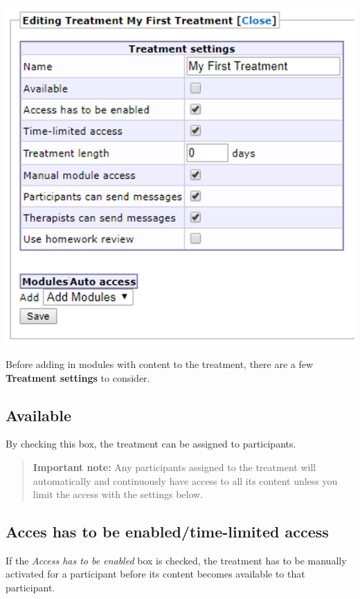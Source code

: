 \documentclass[]{book}
\begin{document}
\includegraphics{images/new-images/treatmentTreatSettings.png}

Before adding in modules with content to the treatment, there are a few \textbf{Treatment settings} to consider.

\hypertarget{available}{%
\subsection{Available}\label{available}}

By checking this box, the treatment can be assigned to participants.

\begin{quote}
\textbf{Important note:} Any participants assigned to the treatment will automatically and continuously have access to all its content unless you limit the access with the settings below.
\end{quote}

\hypertarget{acces-has-to-be-enabledtime-limited-access}{%
\subsection{Acces has to be enabled/time-limited access}\label{acces-has-to-be-enabledtime-limited-access}}

If the \emph{Access has to be enabled} box is checked, the treatment has to be manually activated for a participant before its content becomes available to that participant.
\end{document}

